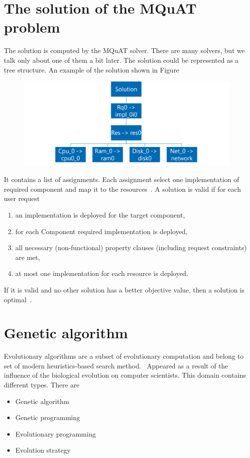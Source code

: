 \section{The solution of the MQuAT problem}
The solution is computed by the MQuAT solver. There are many solvers, but we talk only about one of them a bit later.
The solution could be represented as a tree structure. An example of the solution shown in Figure~\label{fig:SolutionModel}
\begin{figure}
	\centering
	\includegraphics[width=\textwidth]{images/MQuATSolutionModel.png}
	\caption{}
	\label{fig:SolutionModel}
\end{figure}
It contains a list of assignments. Each assignment select one implementation of required component and map it to the resources~\cite{gotz18}.
A solution is valid if for each user request
\begin{enumerate}
	\item an implementation is deployed for the target component,
	\item for each Component required implementation is deployed,
	\item all necessary (non-functional) property clauses (including request constraints) are met,
	\item at most one implementation for each resource is deployed.
\end{enumerate}
If it is valid and no other solution has a better objective value, then a solution is optimal~\cite{gotz18}.

\section{Genetic algorithm}
Evolutionary algorithms are a subset of evolutionary computation and belong to set of modern heuristics-based search method.~\cite{vikhar16}
Appeared as a result of the influence of the biological evolution on computer scientists. This domain contains different types.
There are
\begin{itemize}
	\item Genetic algorithm 
	\item Genetic programming
	\item Evolutionary programming
	\item Evolution strategy
\end{itemize}


